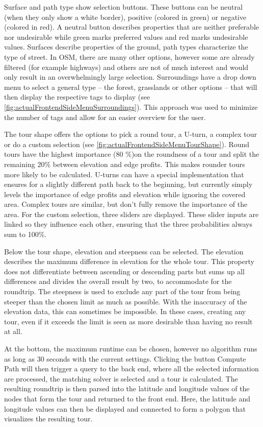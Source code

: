 Surface and path type show selection buttons.
These buttons can be neutral (when they only show a white border), positive (colored in green) or negative (colored in red). 
A neutral button describes properties that are neither preferable nor undesirable while green marks preferred values and red marks undesirable values.
Surfaces describe properties of the ground, path types characterize the type of street.
In OSM, there are many other options, however some are already filtered (for example highways) and others are not of much interest and would only result in an overwhelmingly large selection.
Surroundings have a drop down menu to select a general type -- the forest, grasslands or other options -- that will then display the respective tags to display (see \ref{fig:actualFrontendSideMenuSurroundings}). 
This approach was used to minimize the number of tags and allow for an easier overview for the user.

The tour shape offers the options to pick a round tour, a U-turn, a complex tour or do a custom selection (see \ref{fig:actualFrontendSideMenuTourShape}). 
Round tours have the highest importance (80 \%)on the roundness of a tour and split the remaining 20\% between elevation and edge profits. 
This makes rounder tours more likely to be calculated.
U-turns can have a special implementation that ensures for a slightly different path back to the beginning, but currently simply levels the importance of edge profits and elevation while ignoring the covered area.
Complex tours are similar, but don't fully remove the importance of the area. 
For the custom selection, three sliders are displayed.
These slider inputs are linked so they influence each other, ensuring that the three probabilities always sum to 100\%.

Below the tour shape, elevation and steepness can be selected. 
The elevation describes the maximum difference in elevation for the whole tour. 
This property does not differentiate between ascending or descending parts but sums up all differences and divides the overall result by two, to accommodate for the roundtrip. 
The steepness is used to exclude any part of the tour from being steeper than the chosen limit as much as possible.
With the inaccuracy of the elevation data, this can sometimes be impossible.
In these cases, creating any tour, even if it exceeds the limit is seen as more desirable than having no result at all.

At the bottom, the maximum runtime can be chosen, however no algorithm runs as long as 30 seconds with the current settings.
Clicking the button \glqq Compute Path\grqq{} will then trigger a query to the back end, where all the selected information are processed, the matching solver is selected and a tour is calculated.
The resulting roundtrip is then parsed into the latitude and longitude values of the nodes that form the tour and returned to the front end.
Here, the latitude and longitude values can then be displayed and connected to form a polygon that visualizes the resulting tour.

